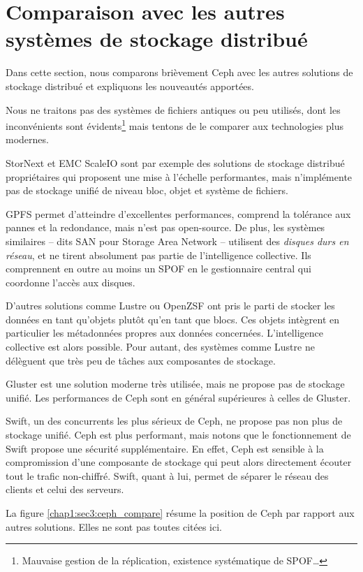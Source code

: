 \section{Comparaison avec les autres systèmes de stockage distribué}

Dans cette section, nous comparons brièvement Ceph avec les autres solutions de stockage distribué et expliquons les nouveautés apportées.

Nous ne traitons pas des systèmes de fichiers antiques ou peu utilisés, dont les inconvénients sont évidents\footnote{Mauvaise gestion de la réplication, existence systématique de SPOF\ldots} mais tentons de le comparer aux technologies plus modernes.

StorNext et EMC ScaleIO sont par exemple des solutions de stockage distribué propriétaires qui proposent une mise à l'échelle performantes, mais n'implémente pas de stockage unifié de niveau bloc, objet et système de fichiers.

GPFS permet d'atteindre d'excellentes performances, comprend la tolérance aux pannes et la redondance, mais n'est pas open-source. De plus, les systèmes similaires -- dits SAN pour Storage Area Network -- utilisent des \textit{disques durs en réseau}, et ne tirent absolument pas partie de l'intelligence collective. Ils comprennent en outre au moins un SPOF en le gestionnaire central qui coordonne l'accès aux disques.

D'autres solutions comme Lustre ou OpenZSF ont pris le parti de stocker les données en tant qu'objets plutôt qu'en tant que blocs. Ces objets intègrent en particulier les métadonnées propres aux données concernées. L'intelligence collective est alors possible. Pour autant, des systèmes comme Lustre ne délèguent que très peu de tâches aux composantes de stockage.

Gluster est une solution moderne très utilisée, mais ne propose pas de stockage unifié. Les performances de Ceph sont en général supérieures à celles de Gluster.

Swift, un des concurrents les plus sérieux de Ceph, ne propose pas non plus de stockage unifié. Ceph est plus performant, mais notons que le fonctionnement de Swift propose une sécurité supplémentaire. En effet, Ceph est sensible à la compromission d'une composante de stockage qui peut alors directement écouter tout le trafic non-chiffré. Swift, quant à lui, permet de séparer le réseau des \og{}clients\fg{} et celui des \og{}serveurs\fg{}.

La figure \ref{chap1:sec3:ceph_compare} résume la position de Ceph par rapport aux autres solutions. Elles ne sont pas toutes citées ici.

